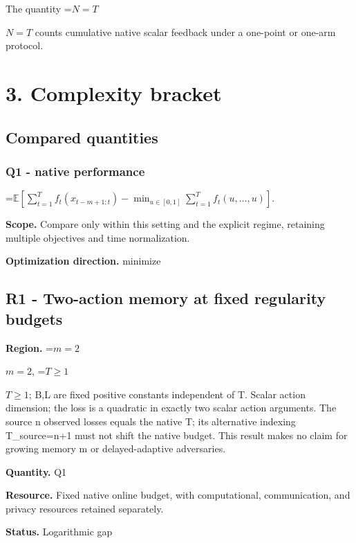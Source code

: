 \documentclass[10pt,a4paper]{article}
\newcommand{\AtlasMath}[1]{\par\begingroup\centering\setbox0=\hbox{$\displaystyle #1$}\ifdim\wd0>1.4\linewidth\typeout{ATLAS WIDE FORMULA: \the\wd0}\fi\ifdim\wd0>\linewidth\resizebox{\linewidth}{!}{\box0}\else\box0\fi\par\endgroup}
\newcommand{\AtlasInlineMath}[1]{\begingroup\setbox0=\hbox{$#1$}\ifdim\wd0>.4\linewidth\endgroup\AtlasMath{#1}\else\endgroup$#1$\fi}
\begin{document}
The quantity \AtlasInlineMath{N=T} counts cumulative native scalar feedback under a one-point or one-arm protocol.



\section{3. Complexity bracket}


\subsection{Compared quantities}


\subsubsection{Q1 - native performance}


\AtlasMath{\mathbb E\!\left[\sum_{t=1}^{T}f_t(x_{t-m+1:t})-\min_{u\in[0,1]}\sum_{t=1}^{T}f_t(u,\ldots,u)\right].}


\textbf{Scope.} Compare only within this setting and the explicit regime, retaining multiple objectives and time normalization.



\textbf{Optimization direction.} minimize



\subsection{R1 - Two-action memory at fixed regularity budgets}


\textbf{Region.} \AtlasInlineMath{m=2}, \AtlasInlineMath{T\ge1}; B,L are fixed positive constants independent of T. Scalar action dimension; the loss is a quadratic in exactly two scalar action arguments. The source n observed losses equals the native T; its alternative indexing T\_source=n+1 must not shift the native budget. This result makes no claim for growing memory m or delayed-adaptive adversaries.



\textbf{Quantity.} Q1



\textbf{Resource.} Fixed native online budget, with computational, communication, and privacy resources retained separately.



\textbf{Status.} Logarithmic gap
\end{document}
